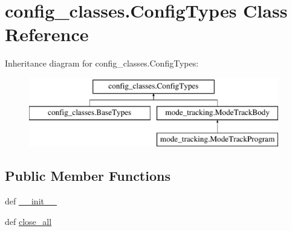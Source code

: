 \hypertarget{classconfig__classes_1_1_config_types}{\section{config\-\_\-classes.\-Config\-Types Class Reference}
\label{classconfig__classes_1_1_config_types}
}
Inheritance diagram for config\-\_\-classes.\-Config\-Types\-:\begin{figure}[H]
\begin{center}
\leavevmode
\includegraphics[height=3.000000cm]{classconfig__classes_1_1_config_types}
\end{center}
\end{figure}
\subsection*{Public Member Functions}
\begin{DoxyCompactItemize}
\item 
def \hyperlink{classconfig__classes_1_1_config_types_ae72c95b861cdf7720bac010da60bd082}{\-\_\-\-\_\-init\-\_\-\-\_\-}
\item 
def \hyperlink{classconfig__classes_1_1_config_types_a73e7c999dc01bc081ae866d485be3836}{close\-\_\-all}
\end{DoxyCompactItemize}
